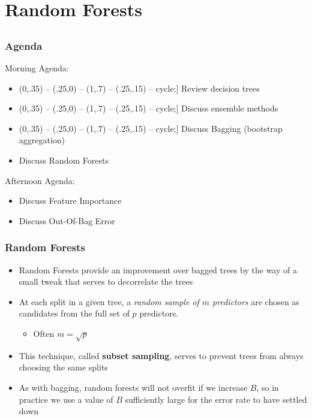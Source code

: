 \documentclass[table,dvipsnames]{beamer}
\def\checkmark{\tikz\fill[scale=0.4](0,.35) -- (.25,0) -- (1,.7) -- (.25,.15) -- cycle;}
\newcommand{\keywd}{\textcolor{myorange}}
\begin{document}


\section{Random Forests}
\subsection{}
\begin{frame}
\frametitle{Agenda}
\scriptsize
Morning Agenda:

\begin{block}{}
\begin{itemize}
    \item[\checkmark] Review decision trees
    \item[\checkmark] Discuss ensemble methods
    \item[\checkmark] Discuss \keywd{Bagging} (bootstrap aggregation)
    \item Discuss \keywd{Random Forests}
\end{itemize}
\end{block}

Afternoon Agenda:

\begin{block}{}
\begin{itemize}
    \item Discuss \keywd{Feature Importance}
    \item Discuss \keywd{Out-Of-Bag Error}
\end{itemize}
\end{block}
\end{frame}


\begin{frame}
\frametitle{Random Forests}
\begin{itemize}
    \item \keywd{Random Forests} provide an improvement over bagged trees by the way of a small tweak that serves to \keywd{decorrelate} the trees
    \item At each split in a given tree, a \textit{random sample of $m$ predictors} are chosen as candidates from the full set of $p$ predictors.
    \begin{itemize}
        \item Often $m = \sqrt{p}$
    \end{itemize}
    \item This technique, called \textbf{subset sampling}, serves to prevent trees from always choosing the same splits
    \item As with bagging, random forests will not overfit if we increase $B$, so in practice we use a value of $B$ sufficiently large for the error rate to have settled down
\end{itemize}
\end{frame}
\end{document}
